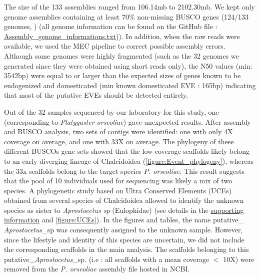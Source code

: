 The size of the 133 assemblies ranged from 106.14mb to 2102.30mb. We kept only genome assemblies containing at least 70\% non-missing BUSCO genes (124/133 genomes, \citep{simao_busco_2015}) (all genome information can be found on the GitHub file : \href{https://github.com/BenjaminGuinet/PhD_defense/blob/main/Supplementary_paper1/Assembly_genome_informations.csv}{Assembly\_genome\_informations.txt})). In addition, when the raw reads were available, we used the MEC pipeline \citep{wu_mec_2020} to correct possible assembly errors. Although some genomes were highly fragmented (such as the 32 genomes we generated since they were obtained using short reads only), the N50 values (min: 3542bp) were equal to or larger than the expected sizes of genes known to be endogenized and domesticated (min known domesticated EVE : 165bp) indicating that most of the putative EVEs should be detected entirely.

Out of the 32 samples sequenced by our laboratory for this study, one (corresponding to \textit{Platygaster orseoliae}) gave unexpected results. After assembly and BUSCO analysis, two sets of contigs were identified:  one with only 4X coverage on average, and one with 33X on average. The phylogeny of these different BUSCOs gene sets showed that the low-coverage scaffolds likely belong to an early diverging lineage of Chalcidoidea  (\figurename{\ref{figure:Event_phylogeny}}), whereas the 33x scaffolds belong to the target species \textit{P. orseoliae}. This result suggests that the pool of 10 individuals used for sequencing was likely a mix of two species. A phylogenetic study based on Ultra Conserved Elements (UCEs) obtained from several species of Chalcidoidea \citep{rasplus_first_2020, cruaud_optimized_2019} allowed to identify the unknown species as sister to  \textit{Aprostocetus sp}  (Eulophidae) (see details in the \hyperref[sec:SI-2]{supporting information} and \figurename{\ref{figure:UCEs}}). In the figures and tables, the name putative\_ \textit{Aprostocetus}\_sp was consequently assigned to the unknown sample. However, since the lifestyle and identity of this species are uncertain, we did not include the corresponding scaffolds in the main analysis. The scaffolds belonging to this putative\_\textit{Aprostocetus}\_sp. (i.e : all scaffolds with a mean coverage $<$ 10X) were removed from the \textit{P. orseoliae} assembly file hosted in NCBI.  

